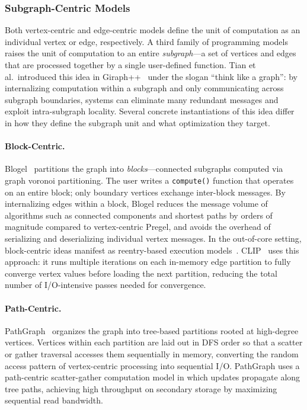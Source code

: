 \subsubsection{Subgraph-Centric Models}
\label{design:subgraph_centric}

Both vertex-centric and edge-centric models define the unit of computation as an individual vertex or edge, respectively.
A third family of programming models raises the unit of computation to an entire \emph{subgraph}---a set of vertices and edges that are processed together by a single user-defined function.
Tian et al.\ introduced this idea in Giraph++~\cite{tian2013giraphpp} under the slogan ``think like a graph'': by internalizing computation within a subgraph and only communicating across subgraph boundaries, systems can eliminate many redundant messages and exploit intra-subgraph locality.
Several concrete instantiations of this idea differ in how they define the subgraph unit and what optimization they target.

\paragraph{Block-Centric.}
Blogel~\cite{yan2014blogel} partitions the graph into \emph{blocks}---connected subgraphs computed via graph voronoi partitioning.
The user writes a \texttt{compute()} function that operates on an entire block; only boundary vertices exchange inter-block messages.
By internalizing edges within a block, Blogel reduces the message volume of algorithms such as connected components and shortest paths by orders of magnitude compared to vertex-centric Pregel, and avoids the overhead of serializing and deserializing individual vertex messages.
In the out-of-core setting, block-centric ideas manifest as reentry-based execution models~\cite[Section~4.2.2]{xu2026oocsurvey}.
CLIP~\cite{ai2018clip} uses this approach: it runs multiple iterations on each in-memory edge partition to fully converge vertex values before loading the next partition, reducing the total number of I/O-intensive passes needed for convergence.

\paragraph{Path-Centric.}
PathGraph~\cite{yuan2016pathgraph} organizes the graph into tree-based partitions rooted at high-degree vertices.
Vertices within each partition are laid out in DFS order so that a scatter or gather traversal accesses them sequentially in memory, converting the random access pattern of vertex-centric processing into sequential I/O.
PathGraph uses a path-centric scatter-gather computation model in which updates propagate along tree paths, achieving high throughput on secondary storage by maximizing sequential read bandwidth.

